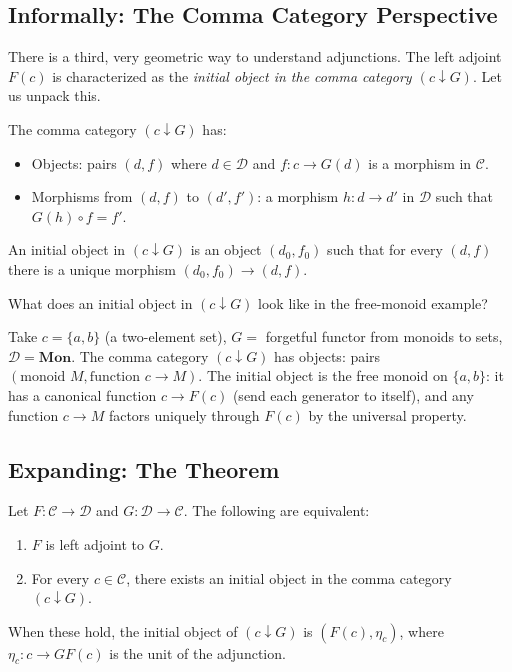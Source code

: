 \subsection{Informally: The Comma Category Perspective}

There is a third, very geometric way to understand adjunctions. The left
adjoint $F(c)$ is characterized as the \emph{initial object in the comma
category $(c \downarrow G)$}. Let us unpack this.

The comma category $(c \downarrow G)$ has:
\begin{itemize}
  \item Objects: pairs $(d, f)$ where $d \in \mathcal{D}$ and $f : c \to G(d)$
        is a morphism in $\mathcal{C}$.
  \item Morphisms from $(d, f)$ to $(d', f')$: a morphism $h : d \to d'$ in
        $\mathcal{D}$ such that $G(h) \circ f = f'$.
\end{itemize}
An initial object in $(c \downarrow G)$ is an object $(d_0, f_0)$ such that for
every $(d, f)$ there is a unique morphism $(d_0, f_0) \to (d, f)$.

\begin{dialog}
What does an initial object in $(c \downarrow G)$ look like in the free-monoid
example?

Take $c = \{a, b\}$ (a two-element set), $G = $ forgetful functor from monoids
to sets, $\mathcal{D} = \mathbf{Mon}$. The comma category $(c \downarrow G)$ has
objects: pairs $(\text{monoid } M, \text{function } c \to M)$. The initial
object is the free monoid on $\{a, b\}$: it has a canonical function $c \to F(c)$
(send each generator to itself), and any function $c \to M$ factors uniquely
through $F(c)$ by the universal property.
\end{dialog}

\subsection{Expanding: The Theorem}

\begin{theorem}
\label{thm:adjoint-initial}
Let $F : \mathcal{C} \to \mathcal{D}$ and $G : \mathcal{D} \to \mathcal{C}$.
The following are equivalent:
\begin{enumerate}
  \item $F$ is left adjoint to $G$.
  \item For every $c \in \mathcal{C}$, there exists an initial object in the
        comma category $(c \downarrow G)$.
\end{enumerate}
When these hold, the initial object of $(c \downarrow G)$ is $(F(c), \eta_c)$,
where $\eta_c : c \to GF(c)$ is the unit of the adjunction.
\end{theorem}

